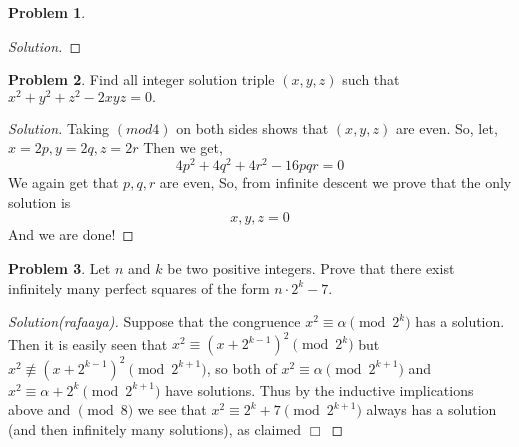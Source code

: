 \documentclass[a4paper,oneside,12 pt]{book}
\theoremstyle{definition}
\theoremstyle{definition}
\newtheorem{prbm}{Problem}[section]
\theoremstyle{definition}
\begin{document}
\begin{prbm}
\begin{proof}[Solution]

\end{proof}

\end{prbm}

\begin{prbm}
Find all integer solution triple $(x,y,z)$ such that $x^2+y^2+z^2-2xyz=0.$
\begin{proof}[Solution]
Taking $(mod4)$ on both sides shows that $(x,y,z)$ are even.
So, let, $x=2p,y=2q,z=2r$
Then we get,
$$4p^2+4q^2+4r^2-16pqr=0$$We again get that $p,q,r$ are even,
So, from infinite descent we prove that the only solution is
$$\boxed{x,y,z=0}$$And we are done!
\end{proof}

\end{prbm}


\begin{prbm}
Let $n$ and $k$ be two positive integers. Prove that there exist infinitely many perfect squares of the form $n \cdot 2^k - 7$.
\begin{proof} [Solution(rafaaya)]
Suppose that the congruence $x^2\equiv \alpha\pmod{2^k}$ has a solution. Then it is easily seen that $x^2\equiv (x+2^{k-1})^2\pmod{2^{k}}$ but $x^2\not\equiv (x+2^{k-1})^2\pmod{2^{k+1}}$, so both of $x^2\equiv \alpha\pmod{2^{k+1}}$ and $x^2\equiv \alpha+2^k\pmod{2^{k+1}}$ have solutions. Thus by the inductive implications above and $\pmod{8}$ we see that $x^2\equiv 2^k+7\pmod{2^{k+1}}$ always has a solution (and then infinitely many solutions), as claimed $\Box$
\end{proof}
\end{prbm}
\end{document}
